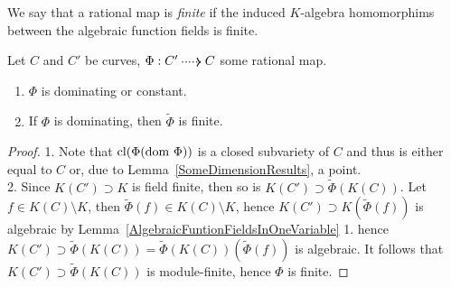     \begin{definition}
        We say that a rational map is \textit{finite} if the induced $K$-algebra homomorphims between the algebraic function fields is finite.
    \end{definition}
    \begin{lemma}\label{RationalMapBetweenCurvesAreDominatingOrConstant}
        Let $C$ and $C'$ be curves, $\Phi: C'\dottedarrow C$ some rational map. 
        \begin{enumerate}
            \item $\Phi$ is dominating or constant.
            \item If $\Phi$ is dominating, then $\widetilde{\Phi}$ is finite.
        \end{enumerate}
    \end{lemma}
    \begin{proof}
        1. Note that $\mathrm{cl}(\Phi(\mathrm{dom} \ \Phi))$ is a closed subvariety of $C$ and thus is either equal to $C$ or, due to Lemma~\ref{SomeDimensionResults}, a point.\\
        2.  Since $K(C')\supset K$ is field finite, then so is $K(C')\supset \widetilde{\Phi}(K(C))$. Let $f\in K(C)\setminus K$, then $\widetilde{\Phi}(f)\in K(C)\setminus K$, hence $K(C')\supset K(\widetilde{\Phi}(f))$ is algebraic by Lemma~\ref{AlgebraicFuntionFieldsInOneVariable} 1. hence $K(C')\supset \widetilde{\Phi}(K(C)) = \widetilde{\Phi}(K(C))(\widetilde{\Phi}(f))$ is algebraic. It follows that $K(C')\supset \widetilde{\Phi}(K(C))$ is module-finite, hence $\Phi$ is finite.  
    \end{proof}
